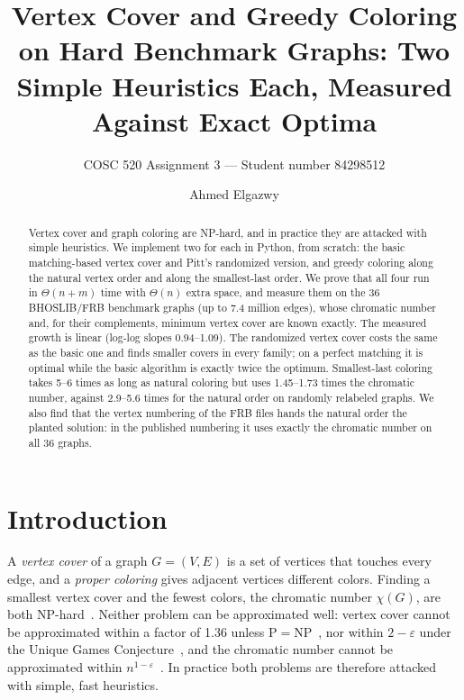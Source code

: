 \documentclass[acmsmall,nonacm]{acmart}
\begin{document}
\title[Vertex Cover and Greedy Coloring on Hard Benchmark Graphs]{Vertex Cover and Greedy Coloring on Hard Benchmark Graphs: Two Simple Heuristics Each, Measured Against Exact Optima}
\subtitle{COSC 520 Assignment 3 --- Student number 84298512}

\author{Ahmed Elgazwy}

\begin{abstract}
Vertex cover and graph coloring are NP-hard, and in practice they are attacked with simple heuristics. We implement two for each in Python, from scratch: the basic matching-based vertex cover and Pitt's randomized version, and greedy coloring along the natural vertex order and along the smallest-last order. We prove that all four run in $\Theta(n+m)$ time with $\Theta(n)$ extra space, and measure them on the 36 BHOSLIB/FRB benchmark graphs (up to 7.4 million edges), whose chromatic number and, for their complements, minimum vertex cover are known exactly. The measured growth is linear (log-log slopes 0.94--1.09). The randomized vertex cover costs the same as the basic one and finds smaller covers in every family; on a perfect matching it is optimal while the basic algorithm is exactly twice the optimum. Smallest-last coloring takes 5--6 times as long as natural coloring but uses 1.45--1.73 times the chromatic number, against 2.9--5.6 times for the natural order on randomly relabeled graphs. We also find that the vertex numbering of the FRB files hands the natural order the planted solution: in the published numbering it uses exactly the chromatic number on all 36 graphs.
\end{abstract}


\maketitle

\section{Introduction}

A \emph{vertex cover} of a graph $G=(V,E)$ is a set of vertices that touches
every edge, and a \emph{proper coloring} gives adjacent vertices different
colors. Finding a smallest vertex cover and the fewest colors, the chromatic
number $\chi(G)$, are both NP-hard~\cite{karp1972}. Neither problem can be
approximated well: vertex cover cannot be approximated within a factor of 1.36
unless P${}={}$NP~\cite{dinur2005}, nor within $2-\varepsilon$ under the Unique
Games Conjecture~\cite{khot2008}, and the chromatic number cannot be
approximated within $n^{1-\varepsilon}$~\cite{zuckerman2007}. In practice both
problems are therefore attacked with simple, fast heuristics.
\end{document}
